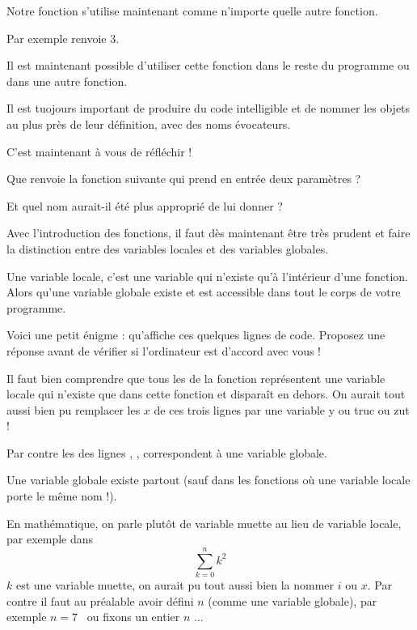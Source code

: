 \change

Notre fonction s'utilise maintenant comme n'importe quelle autre fonction.

Par exemple  renvoie $3$.

\change

Il est maintenant possible d'utiliser cette fonction 
dans le reste du programme ou dans une autre fonction.

Il est tuojours important de produire du code intelligible et de nommer les objets au plus près de leur définition, avec des noms évocateurs.

C'est maintenant à vous de réfléchir !

Que renvoie la fonction suivante qui prend en entrée deux paramètres ? 

Et quel nom aurait-il été plus approprié de lui donner ?


\diapo

Avec l'introduction des fonctions, il faut dès maintenant être très prudent et faire la distinction entre des variables locales 
et des variables globales.

Une variable locale, c'est une variable qui n'existe qu'à 
l'intérieur d'une fonction. 
Alors qu'une variable globale existe et est accessible dans tout le corps de votre programme.

Voici une petit énigme : qu'affiche ces quelques lignes de code.
Proposez une réponse avant de vérifier si l'ordinateur est d'accord avec vous !

Il faut bien comprendre que tous les  de la fonction
représentent une variable locale qui n'existe que dans 
cette fonction et disparaît 
en dehors. On aurait tout aussi bien pu remplacer les $x$ de ces trois lignes
par une variable y ou truc ou zut !


Par contre les  des lignes
, , 
correspondent à une variable globale.

Une variable globale existe partout 
(sauf dans les fonctions où une variable
locale porte le même nom !).

\change 

En mathématique, on parle plutôt de variable muette au lieu 
de variable locale, par exemple dans 
$$\sum_{k=0}^n k^2$$
$k$ est une variable muette, on aurait pu tout aussi bien la nommer $i$ ou $x$.
Par contre il faut au préalable avoir défini $n$ 
(comme une variable globale), par exemple \og $n=7$  \fg\ ou \og 
fixons un entier $n$  \fg...


